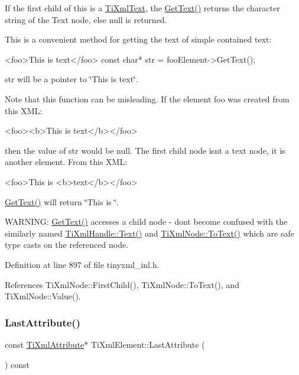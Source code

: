 If the first child of \textquotesingle{}this\textquotesingle{} is a \hyperlink{class_ti_xml_text}{Ti\+Xml\+Text}, the \hyperlink{class_ti_xml_element_af0f814ecbd43d50d4cdbdf4354d3da39}{Get\+Text()} returns the character string of the Text node, else null is returned.

This is a convenient method for getting the text of simple contained text\+: \begin{DoxyVerb}<foo>This is text</foo>
const char* str = fooElement->GetText();
\end{DoxyVerb}


\textquotesingle{}str\textquotesingle{} will be a pointer to \char`\"{}\+This is text\char`\"{}.

Note that this function can be misleading. If the element foo was created from this X\+ML\+: \begin{DoxyVerb}<foo><b>This is text</b></foo>
\end{DoxyVerb}


then the value of str would be null. The first child node isn\textquotesingle{}t a text node, it is another element. From this X\+ML\+: \begin{DoxyVerb}<foo>This is <b>text</b></foo>
\end{DoxyVerb}
 \hyperlink{class_ti_xml_element_af0f814ecbd43d50d4cdbdf4354d3da39}{Get\+Text()} will return \char`\"{}\+This is \char`\"{}.

W\+A\+R\+N\+I\+NG\+: \hyperlink{class_ti_xml_element_af0f814ecbd43d50d4cdbdf4354d3da39}{Get\+Text()} accesses a child node -\/ don\textquotesingle{}t become confused with the similarly named \hyperlink{class_ti_xml_handle_ad3b502c72059421e4dfcc7bda3c392fe}{Ti\+Xml\+Handle\+::\+Text()} and \hyperlink{class_ti_xml_node_a3ddfbcac78fbea041fad57e5c6d60a03}{Ti\+Xml\+Node\+::\+To\+Text()} which are safe type casts on the referenced node. 

Definition at line 897 of file tinyxml\+\_\+inl.\+h.



References Ti\+Xml\+Node\+::\+First\+Child(), Ti\+Xml\+Node\+::\+To\+Text(), and Ti\+Xml\+Node\+::\+Value().

\hypertarget{class_ti_xml_element_a42939f55ed4cec5fc1daaecfded7ba16}{}\label{class_ti_xml_element_a42939f55ed4cec5fc1daaecfded7ba16} 
\subsubsection{\texorpdfstring{Last\+Attribute()}{LastAttribute()}\hspace{0.1cm}{\footnotesize\ttfamily [1/2]}}
{\footnotesize\ttfamily const \hyperlink{class_ti_xml_attribute}{Ti\+Xml\+Attribute}$\ast$ Ti\+Xml\+Element\+::\+Last\+Attribute (\begin{DoxyParamCaption}{ }\end{DoxyParamCaption}) const\hspace{0.3cm}{\ttfamily [inline]}}



